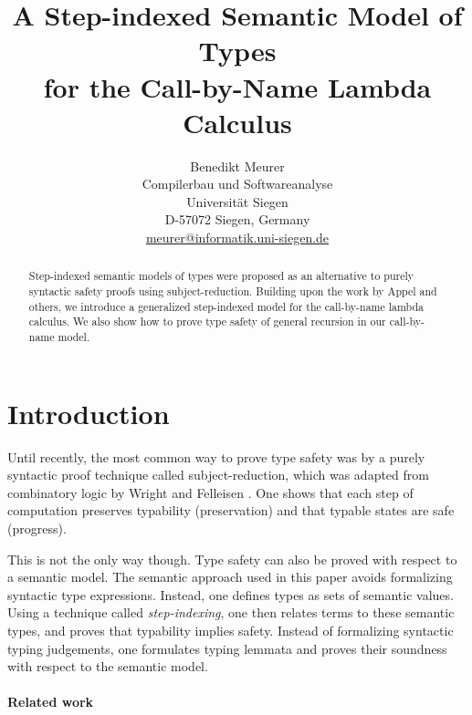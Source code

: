 \documentclass[10pt,a4paper,final,twocolumn]{article}
\theoremstyle{definition}
\theoremstyle{plain}
\begin{document}
\author{%
  Benedikt Meurer\\
  Compilerbau und Softwareanalyse\\
  Universit\"at Siegen\\
  D-57072 Siegen, Germany\\
  \url{meurer@informatik.uni-siegen.de}
}
\date{}
\title{
  A Step-indexed Semantic Model of Types\\
  for the Call-by-Name Lambda Calculus
}
\maketitle

\begin{abstract}
  Step-indexed semantic models of types were proposed as an alternative to purely syntactic
  safety proofs using subject-reduction. Building upon the work by Appel and others, we
  introduce a generalized step-indexed model for the call-by-name lambda calculus. We also
  show how to prove type safety of general recursion in our call-by-name model.
\end{abstract}


\section{Introduction}
\label{sec:Introduction}


Until recently, the most common way to prove type safety was by a purely syntactic proof
technique called subject-reduction, which was adapted from combinatory logic by Wright
and Felleisen \cite{Wright94}. One shows that each step of computation preserves
typability (preservation) and that typable states are safe (progress).

This is not the only way though. Type safety can also be proved with respect to a semantic model. The
semantic approach used in this paper avoids formalizing syntactic type expressions. Instead, one defines 
types as sets of semantic values. Using a technique called \emph{step-indexing}, one then relates terms
to these semantic types, and proves that typability implies safety. Instead of formalizing syntactic
typing judgements, one formulates typing lemmata and proves their soundness with respect to the semantic
model.


\paragraph{Related work}
\label{par:Related_work}
\end{document}
